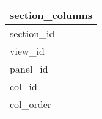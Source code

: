 \documentclass{article}
\begin{document}

\begin{tabular}{|l|} \hline
\textbf{section\_columns} \\ \hline
section\_id \\ \hline
view\_id \\ \hline
panel\_id \\ \hline
col\_id \\ \hline
col\_order \\ \hline
\end{tabular}
\end{document}

